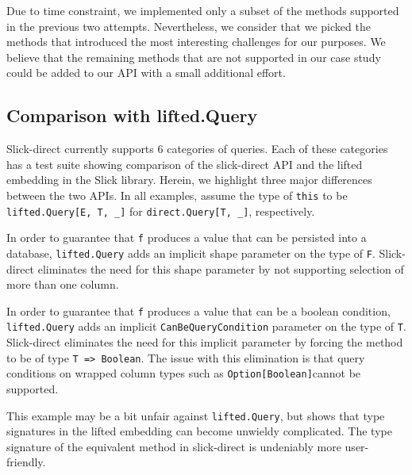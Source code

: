 Due to time constraint, we implemented only a subset of the methods supported in the previous two attempts.
Nevertheless, we consider that we picked the methods that introduced the most interesting challenges for our purposes.
We believe that the remaining methods that are not supported in our case study could be added to our API with a small additional effort.

\subsection{Comparison with lifted.Query} %
\label{sub:Comparisonwithlifted.Query}
Slick-direct currently supports 6 categories of queries.
Each of these categories has a test suite showing comparison of the slick-direct API and the lifted embedding in the Slick library.
Herein, we highlight three major differences between the two APIs.
In all examples, assume the type of \texttt{this} to be \texttt{lifted.Query[E, T, \_]} for \texttt{direct.Query[T, \_]}, respectively.

In order to guarantee that \texttt{f} produces a value that can be persisted into a database, \texttt{lifted.Query} adds an implicit shape parameter on the type of \texttt{F}.
Slick-direct eliminates the need for this shape parameter by not supporting selection of more than one column.


In order to guarantee that \texttt{f} produces a value that can be a boolean condition, \texttt{lifted.Query} adds an implicit \texttt{CanBeQueryCondition} parameter on the type of \texttt{T}.
Slick-direct eliminates the need for this implicit parameter by forcing the method to be of type \texttt{T => Boolean}.
The issue with this elimination is that query conditions on wrapped column types such as \texttt{Option[Boolean]}cannot be supported.


This example may be a bit unfair against \texttt{lifted.Query}, but shows that type signatures in the lifted embedding can become unwieldy complicated.
The type signature of the equivalent method in slick-direct is undeniably more user-friendly.




